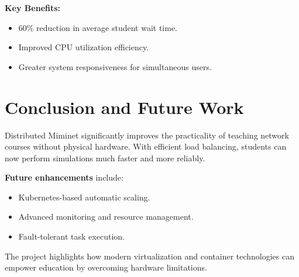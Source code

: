 \documentclass[14pt]{article}
\begin{document}
\noindent\textbf{Key Benefits:}
\begin{itemize}
    \item 60\% reduction in average student wait time.
    \item Improved CPU utilization efficiency.
    \item Greater system responsiveness for simultaneous users.
\end{itemize}

\section{Conclusion and Future Work}
Distributed Miminet\cite{miminet} significantly improves the practicality of teaching network courses without physical hardware. With efficient load balancing, students can now perform simulations much faster and more reliably.

\textbf{Future enhancements} include:
\begin{itemize}
    \item Kubernetes-based automatic scaling.
    \item Advanced monitoring and resource management.
    \item Fault-tolerant task execution.
\end{itemize}

The project highlights how modern virtualization and container technologies can empower education by overcoming hardware limitations.

\setmonofont{CMU Typewriter Text}


\end{document}
